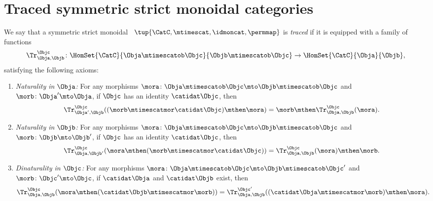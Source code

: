 
\section{Traced symmetric strict monoidal categories}
\publictodomessage

\begin{widepar}
    \begin{ctdefinition}
        \label{def:traced-sym-strict-mon-cat}
        We say that a symmetric strict monoidal  ~$\tup{\CatC, \mtimescat, \idmoncat, \permmap}$ is \emph{traced} if it is equipped with a family of functions
        \begin{equation}\label{eq:trace-def-trace-map}
            \Tr_{\Obja,\Objb}^\Objc\colon \HomSet{\CatC}{\Obja \mtimescatob \Objc}{\Objb\mtimescatob \Objc}\to \HomSet{\CatC}{\Obja}{\Objb},
        \end{equation}
        satisfying the following axioms:
        \begin{enumerate}

            \item \emph{Naturality in $\Obja$:} For any morphisms $\mora\colon \Obja\mtimescatob \Objc \mto \Objb\mtimescatob \Objc$ and $\morb \colon \Obja' \mto \Obja$, if $\Objc$ has an identity $\catidat\Objc$, then
                  \begin{equation}\label{eq:trace-def-naturality-in-source}
                      \Tr_{\Obja', \Objb}^\Objc ( (\morb \mtimescatmor \catidat\Objc) \mthen \mora) = \morb \mthen \Tr_{\Obja, \Objb}^\Objc (\mora).
                  \end{equation}

            \item \emph{Naturality in $\Objb$:}
                  For any morphisms $\mora\colon \Obja\mtimescatob \Objc \mto \Objb\mtimescatob \Objc$ and $\morb \colon \Objb \mto \Objb'$, if $\Objc$ has an identity $\catidat\Objc$, then
                  \begin{equation}\label{eq:trace-def-naturality-in-target}
                      \Tr_{\Obja, \Objb'}^\Objc ( \mora \mthen (\morb \mtimescatmor \catidat\Objc) ) = \Tr_{\Obja, \Objb}^\Objc (\mora) \mthen \morb.
                  \end{equation}

            \item \emph{Dinaturality in $\Objc$:}
                  For any morphisms $\mora \colon \Obja \mtimescatob \Objc \mto \Objb \mtimescatob \Objc'$ and $\morb \colon \Objc' \mto \Objc$, if $\catidat\Obja$ and $\catidat\Objb$ exist, then
                  \begin{equation}\label{eq:trace-def-dinaturality-in-traced-object}
                      \Tr_{\Obja, \Objb}^{\Objc} (\mora \mthen (\catidat\Objb \mtimescatmor \morb)) = \Tr_{\Obja, \Objb}^{\Objc'}((\catidat\Obja \mtimescatmor \morb) \mthen \mora).
                  \end{equation}


\end{enumerate}
\end{ctdefinition}
\end{widepar}
